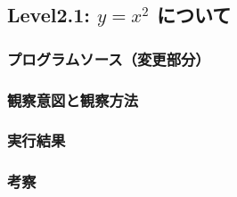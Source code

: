 \subsection{Level2.1: $y=x^2$ について}
\subsubsection{プログラムソース（変更部分）}

\subsubsection{観察意図と観察方法}
\subsubsection{実行結果}
\subsubsection{考察}

